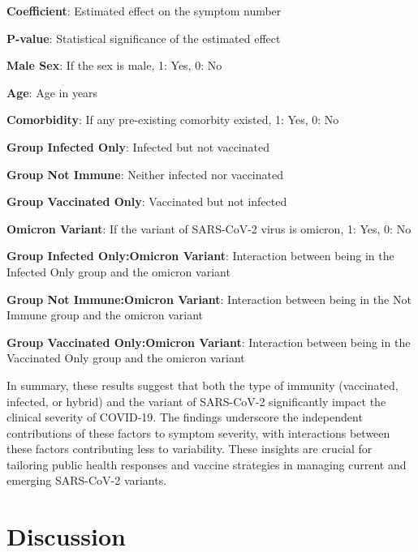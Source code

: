 \documentclass[11pt]{article}
\begin{document}
\begin{table}[h]
\begin{threeparttable}
\begin{tablenotes}
\item \textbf{Coefficient}: Estimated effect on the symptom number
\item \textbf{P-value}: Statistical significance of the estimated effect
\item \textbf{Male Sex}: If the sex is male, 1: Yes, 0: No
\item \textbf{Age}: Age in years
\item \textbf{Comorbidity}: If any pre-existing comorbity existed, 1: Yes, 0: No
\item \textbf{Group Infected Only}: Infected but not vaccinated
\item \textbf{Group Not Immune}: Neither infected nor vaccinated
\item \textbf{Group Vaccinated Only}: Vaccinated but not infected
\item \textbf{Omicron Variant}: If the variant of SARS-CoV-2 virus is omicron, 1: Yes, 0: No
\item \textbf{Group Infected Only:Omicron Variant}: Interaction between being in the Infected Only group and the omicron variant
\item \textbf{Group Not Immune:Omicron Variant}: Interaction between being in the Not Immune group and the omicron variant
\item \textbf{Group Vaccinated Only:Omicron Variant}: Interaction between being in the Vaccinated Only group and the omicron variant
\end{tablenotes}
\end{threeparttable}
\end{table}

In summary, these results suggest that both the type of immunity (vaccinated, infected, or hybrid) and the variant of SARS-CoV-2 significantly impact the clinical severity of COVID-19. The findings underscore the independent contributions of these factors to symptom severity, with interactions between these factors contributing less to variability. These insights are crucial for tailoring public health responses and vaccine strategies in managing current and emerging SARS-CoV-2 variants.

\section*{Discussion}
\end{document}
